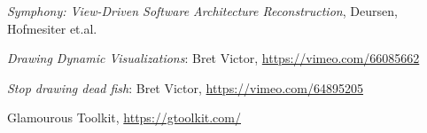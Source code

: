 \documentclass[a4paper,11pt]{article}
\begin{document}
\begin{thebibliography}{9}
\textit{Symphony: View-Driven Software Architecture Reconstruction}, Deursen, Hofmesiter et.al.

\textit{Drawing Dynamic Visualizations}: Bret Victor, \href{https://vimeo.com/66085662}{https://vimeo.com/66085662}

\textit{Stop drawing dead fish}: Bret Victor, \href{https://vimeo.com/64895205}{https://vimeo.com/64895205}

 Glamourous Toolkit, \href{https://gtoolkit.com/}{https://gtoolkit.com/}
\end{thebibliography}
\end{document}
